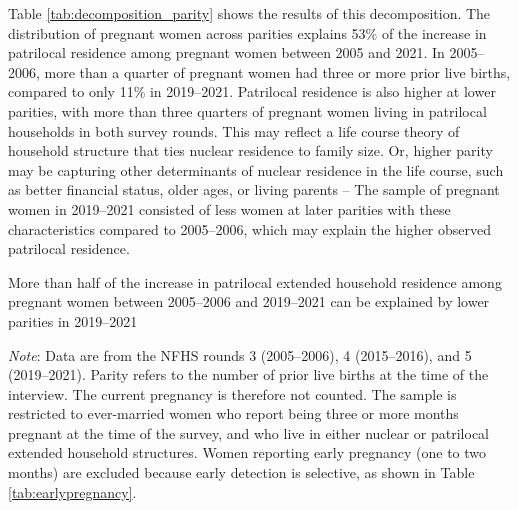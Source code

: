 \documentclass[10pt,twoside,reqno]{article}
\begin{document}
Table \ref{tab:decomposition_parity} shows the results of this decomposition. The distribution of pregnant women across parities explains 53\% of the increase in patrilocal residence among pregnant women between 2005 and 2021. In 2005--2006, more than a quarter of pregnant women had three or more prior live births, compared to only 11\% in 2019--2021. Patrilocal residence is also higher at lower parities, with more than three quarters of pregnant women living in patrilocal households in both survey rounds. This may reflect a life course theory of household structure that ties nuclear residence to family size. Or, higher parity may be capturing other determinants of nuclear residence in the life course, such as better financial status, older ages, or living parents -- The sample of pregnant women in 2019--2021 consisted of less women at later parities with these characteristics compared to 2005--2006, which may explain the higher observed patrilocal residence. 

\begin{table}[H]
\sansmath
\sffamily
\captionsetup{style=CAPTAB}
\caption{More than half of the increase in patrilocal extended household residence among pregnant women between 2005--2006 and 2019--2021 can be explained by lower parities in 2019--2021}
\label{tab:decomposition_parity}
\vspace{-4pt}

\begin{center}
\begin{scriptsize}
\begin{adjustbox}{max width=\textheight, max totalheight=\textwidth, keepaspectratio}
\setlength{\tabcolsep}{4pt}
\renewcommand{\arraystretch}{1.3}

\end{adjustbox}
\end{scriptsize}
\end{center}

\vspace{1ex}
\small\scriptsize{\textsf{\textit{Note}: Data are from the NFHS rounds 3 (2005--2006), 4 (2015--2016), and 5 (2019--2021).}}
\newline\small\scriptsize{\textsf{Parity refers to the number of prior live births at the time of the interview.  The current pregnancy is therefore not counted.}}
\newline\small\scriptsize{\textsf{The sample is restricted to ever-married women who report being three or more months pregnant at the time of the survey, and who live in either nuclear or patrilocal extended household structures. Women reporting early pregnancy (one to two months) are excluded because early detection is selective, as shown in Table \ref{tab:earlypregnancy}. }}

\end{table}
\end{document}
